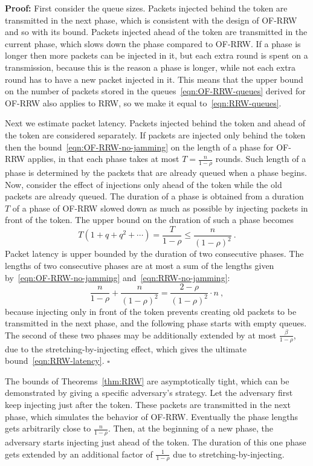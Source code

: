 \documentclass[11pt]{article}
\newcommand{\qed}{\hfill $\square$}
\newenvironment{proof}{\noindent\textbf{Proof: }}{\qed \smallbreak}
\begin{document}
\begin{proof}
First consider the queue sizes. 
Packets injected behind the token are transmitted in the next phase, which is consistent with the design of \textsc{OF-RRW} and so with its bound.
Packets injected ahead of the token are transmitted in the current phase, which slows down the phase compared to \textsc{OF-RRW}.
If a phase is longer then more packets can be injected in it, but each extra round is spent on a  transmission, because this is the reason a phase is longer, while not each extra round has to have a new packet injected in it.
This means that the upper bound on the number of packets stored in the queues~\eqref{eqn:OF-RRW-queues} derived for \textsc{OF-RRW} also applies to \textsc{RRW}, so we make it equal to~\eqref{eqn:RRW-queues}.

Next we estimate packet latency.
Packets injected behind the token and ahead of the token are considered separately.
If packets are injected only behind the token then the bound~\eqref{eqn:OF-RRW-no-jamming} on the length of a phase for \textsc{OF-RRW} applies, in that each phase takes at most $T=\frac{n}{1-\rho}$ rounds.
Such length of a phase is determined by the packets that are already queued when a phase begins.
Now, consider the effect of injections only ahead of the token while the old packets are already queued.
The duration of a phase is obtained from a duration $T$ of a phase of \textsc{OF-RRW} slowed down as much as possible by injecting packets in front of the token.
The upper bound on the duration of such a phase becomes
\begin{equation}
\label{eqn:RRW-no-jamming}
T(1+q + q^2+\cdots)=\frac{T}{1-\rho}\le \frac{n}{(1-\rho)^2}
\ .
\end{equation}
Packet latency is upper bounded by the duration of two consecutive phases.
The lengths of two consecutive phases are at most a sum of the lengths given by~\eqref{eqn:OF-RRW-no-jamming} and~\eqref{eqn:RRW-no-jamming}:
\[
\frac{n}{1-\rho} + \frac{n}{(1-\rho)^2} = \frac{2-\rho}{(1-\rho)^2}\cdot n
\ ,
\]
because injecting only in front of the token prevents creating old packets to be transmitted in the next phase, and the following phase starts with empty queues.
The second of these two phases may be additionally extended by at most  $\frac{\beta}{1-\rho}$,  due to the stretching-by-injecting effect, which gives the ultimate bound~\eqref{eqn:RRW-latency}.
\end{proof}



The bounds of Theorems~\ref{thm:RRW}  are asymptotically tight, which can be demonstrated by giving a specific adversary's strategy.
Let the adversary first keep injecting just after the token.
These packets are transmitted in the next phase, which simulates the behavior of \textsc{OF-RRW}.
Eventually the phase lengths gets arbitrarily close to $\frac{n}{1-\rho}$.
Then, at the beginning of a new phase, the adversary starts injecting just ahead of the token.
The duration of this one phase gets extended by an additional factor of $\frac{1}{1-\rho}$ due to stretching-by-injecting.
\end{document}
